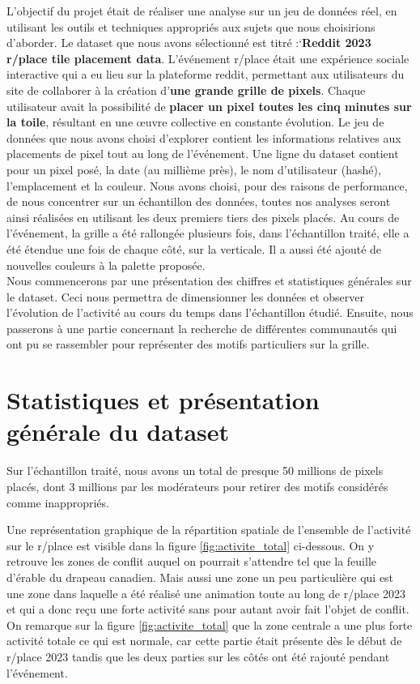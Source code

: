 \documentclass[a4paper]{article}
\begin{document}
{L’objectif du projet était de réaliser une analyse sur un jeu de données réel, en utilisant les outils et techniques appropriés aux sujets que nous choisirions d'aborder. Le dataset que nous avons sélectionné est titré :`\textbf{Reddit 2023 r/place tile placement data}. L'événement r/place était une expérience sociale interactive qui a eu lieu sur la plateforme reddit, permettant aux utilisateurs du site de collaborer à la création d'\textbf{une grande grille de pixels}. Chaque utilisateur avait la possibilité de \textbf{placer un pixel toutes les cinq minutes sur la toile}, résultant en une œuvre collective en constante évolution. Le jeu de données que nous avons choisi d'explorer contient les informations relatives aux placements de pixel tout au long de l'événement. 
Une ligne du dataset contient pour un pixel posé, la date (au millième près), le nom d'utilisateur (hashé), l'emplacement et la couleur. 
Nous avons choisi, pour des raisons de performance, de nous concentrer sur un échantillon des données, toutes nos analyses seront ainsi réalisées en utilisant les deux premiers tiers des pixels placés.
Au cours de l'événement, la grille a été rallongée plusieurs fois, dans l'échantillon traité, elle a été étendue une fois de chaque côté, sur la verticale. Il a aussi été ajouté de nouvelles couleurs à la palette proposée.\\

Nous commencerons par une présentation des chiffres et statistiques générales sur le dataset. Ceci nous permettra de dimensionner les données et observer l'évolution de l'activité au cours du temps dans l'échantillon étudié. Ensuite, nous passerons à une partie concernant la recherche de différentes communautés qui ont pu se rassembler pour représenter des motifs particuliers sur la grille.\\

\section{Statistiques et présentation générale du dataset}

Sur l'échantillon traité, nous avons un total de presque 50 millions de pixels placés, dont 3 millions par les modérateurs pour retirer des motifs considérés comme inappropriés.

Une représentation graphique de la répartition spatiale de l'ensemble de l'activité sur le r/place est visible dans la figure \ref{fig:activite_total} ci-dessous. On y retrouve les zones de conflit auquel on pourrait s'attendre tel que la feuille d'érable du drapeau canadien. Mais aussi une zone un peu particulière qui est une zone dans laquelle a été réalisé une animation toute au long de r/place 2023 et qui a donc reçu une forte activité sans pour autant avoir fait l'objet de conflit. On remarque sur la figure \ref{fig:activite_total} que la zone centrale a une plus forte activité totale ce qui est normale, car cette partie était présente dès le début de r/place 2023 tandis que les deux parties sur les côtés ont été rajouté pendant l'événement.

}
\end{document}
